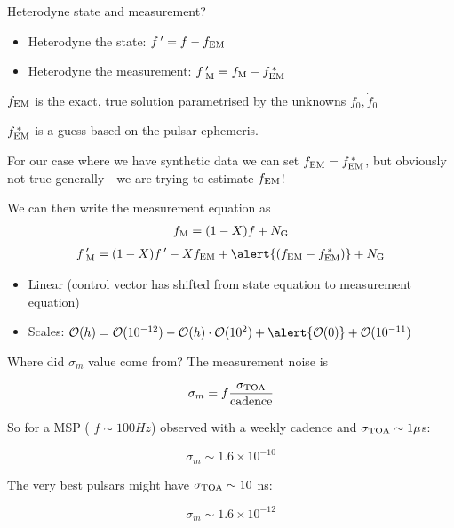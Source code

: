 \documentclass[10pt]{beamer}
\begin{document}
\begin{frame}{Heterodyne state and measurement?}
	
	\begin{itemize}
		\item Heterodyne the state: $f \, ' = f - f_{\rm EM}$ 
		\item Heterodyne the measurement: $f \, '_{\rm M}  = f_{\rm M} - f^{\, *}_{\rm EM}$ 
	\end{itemize}
	
	$f_{\rm EM}$ is the exact, true solution parametrised by the unknowns $f_0, \dot{f}_0$
	
	 $f^{\, *}_{\rm EM}$ is a guess based on the pulsar ephemeris. 
	 
	 For our case where we have synthetic data we can set $f_{\rm EM} = f^{\, *}_{\rm EM}$, but obviously not true generally - we are trying to estimate $f_{\rm EM}$!
	
	We can then write the measurement equation as
	\begin{eqnarray}
		f_{\rm M} = (1 - X)f + N_{\rm G} 
	\end{eqnarray}
\begin{eqnarray}
	f \, '_{\rm M} = (1 - X)f \, ' - X f_{\rm EM} + \alert{(f_{\rm EM} - f^{\, *}_{\rm EM})} +  N_{\rm G}
\end{eqnarray}
	
	\begin{itemize}
		\item Linear \checkmark (control vector has shifted from state equation to measurement equation)
		\item Scales: $\mathcal{O}(h) = \mathcal{O}(10^{-12}) - \mathcal{O}(h)\cdot\mathcal{O}(10^2) + \alert{\mathcal{O}(0)} + \mathcal{O}(10^{-11})$ \checkmark
	\end{itemize}
	
	
\end{frame}






\begin{frame}[fragile]{Where did $\sigma_m$ value come from?}
The measurement noise is

$$ \sigma_m = f \frac{\sigma_{\rm TOA}}{\rm cadence}$$

So for a MSP ( $f \sim 100 Hz$) observed with a weekly cadence and $\sigma_{\rm TOA} \sim 1 \mu$s:


$$\sigma_m \sim 1.6 \times 10^{-10}$$

The very best pulsars might have $\sigma_{\rm TOA} \sim 10$ ns:

$$\sigma_m \sim 1.6 \times 10^{-12}$$
\end{frame}
\end{document}
